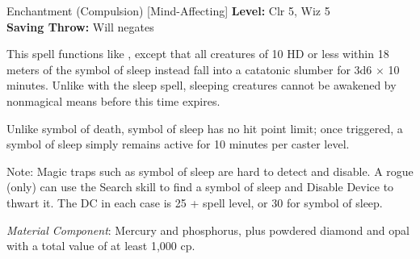 {Enchantment (Compulsion) [Mind-Affecting]}
{
	\textbf{Level:}
	Clr 5, Wiz 5\\
	\textbf{Saving Throw:}
	Will negates\\
}
{
	This spell functions like , except that all creatures of 10 HD or less within 18 meters of the symbol of sleep instead fall into a catatonic slumber for 3d6 $\times$ 10 minutes. Unlike with the sleep spell, sleeping creatures cannot be awakened by nonmagical means before this time expires.

	Unlike symbol of death, symbol of sleep has no hit point limit; once triggered, a symbol of sleep simply remains active for 10 minutes per caster level.

	Note: Magic traps such as symbol of sleep are hard to detect and disable. A rogue (only) can use the Search skill to find a symbol of sleep and Disable Device to thwart it. The DC in each case is 25 + spell level, or 30 for symbol of sleep.

	\textit{Material Component}:
	Mercury and phosphorus, plus powdered diamond and opal with a total value of at least 1,000 cp.

}
